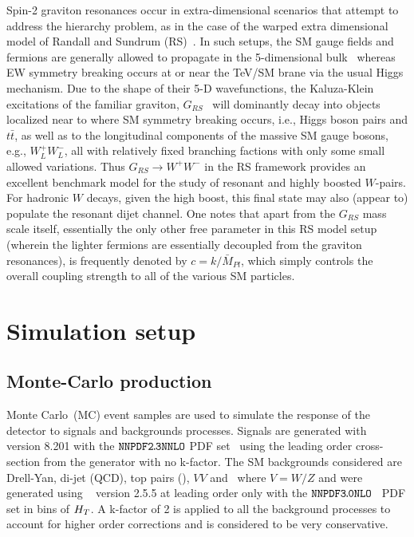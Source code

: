 Spin-2 graviton resonances occur in extra-dimensional scenarios that attempt to address the hierarchy problem, as in the case of the warped extra dimensional model of
Randall and Sundrum (RS)~\cite{Randall:1999ee}. In such setups, the SM gauge fields and fermions are generally allowed to propagate in the 5-dimensional
bulk~\cite{Pomarol:1999ad,Davoudiasl:1999tf,Grossman:1999ra,Davoudiasl:2000wi,Gherghetta:2000qt} whereas EW symmetry breaking occurs at or near the TeV/SM brane
via the usual Higgs mechanism. 
Due to the shape of their 5-D wavefunctions, the Kaluza-Klein excitations of the familiar graviton, $G_{RS}$~\cite{Davoudiasl:1999jd} will dominantly decay into
objects localized near to where SM symmetry breaking occurs, i.e., Higgs boson pairs and $t\bar t$, as well as to the longitudinal components of the massive SM gauge bosons, e.g.,
$W^+_L W^-_L$, all with relatively fixed branching factions with only some small allowed variations. Thus $G_{RS}\rightarrow
W^+W^-$ in the RS framework provides an excellent benchmark model for the study of resonant and highly boosted $W$-pairs. For hadronic $W$ decays, given the high boost, this final state may also (appear to) populate the resonant dijet channel. One notes that apart from the $G_{RS}$ mass scale itself, essentially the only other
free parameter in this RS model setup (wherein the lighter fermions are essentially decoupled from the graviton resonances), is frequently denoted by $c=k/\bar M_{Pl}$, which simply
controls the overall coupling strength to all of the various SM particles.


\section{Simulation setup}
\label{sec:simulation}

\subsection{Monte-Carlo production}
\label{subsec:mcprod}

Monte Carlo~(MC) event samples are used to simulate the response of the detector to signals and backgrounds processes. Signals are generated with \py~\cite{Sjostrand:2014zea} version 8.201 with the $\texttt{NNPDF2\!.\!3NNLO}$ PDF set~\cite{Ball:2014uwa} using the leading order cross-section from the generator with no k-factor. The SM backgrounds considered are Drell-Yan, di-jet (QCD), top pairs (\ttbar), $VV$ and \vj\ where $V=W/Z$ and were generated using \MGAMC~\cite{Alwall:2014hca} version 2.5.5 at leading order only with the $\texttt{NNPDF3\!.\!0NLO}$~\cite{Ball:2014uwa} PDF set in bins of $H_{T}$. A k-factor of 2 is applied to all the background processes to account for higher order corrections and is considered to be very conservative.


